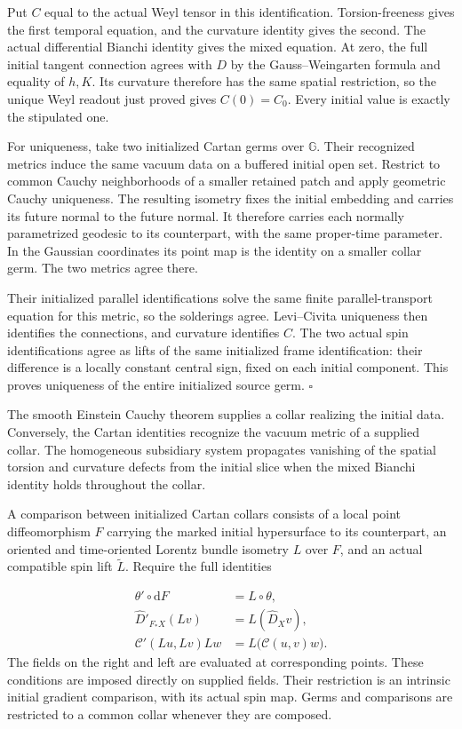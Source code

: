 \documentclass[
  english,
  11pt,
  reqno]{amsart}
\begin{document}
Put \(C\) equal to the actual Weyl tensor in this identification.
Torsion-freeness gives the first temporal equation, and the curvature
identity gives the second. The actual differential Bianchi identity
gives the mixed equation. At zero, the full initial tangent connection
agrees with \(D\) by the Gauss--Weingarten formula and equality of
\(h,K\). Its curvature therefore has the same spatial restriction, so
the unique Weyl readout just proved gives \(C(0)=C_0\). Every initial
value is exactly the stipulated one.

For uniqueness, take two initialized Cartan germs over \(\mathbb G\).
Their recognized metrics induce the same vacuum data on a buffered
initial open set. Restrict to common Cauchy neighborhoods of a smaller
retained patch and apply geometric Cauchy uniqueness. The resulting
isometry fixes the initial embedding and carries its future normal to
the future normal. It therefore carries each normally parametrized
geodesic to its counterpart, with the same proper-time parameter. In the
Gaussian coordinates its point map is the identity on a smaller collar
germ. The two metrics agree there.

Their initialized parallel identifications solve the same finite
parallel-transport equation for this metric, so the solderings agree.
Levi--Civita uniqueness then identifies the connections, and curvature
identifies \(C\). The two actual spin identifications agree as lifts of
the same initialized frame identification: their difference is a locally
constant central sign, fixed on each initial component. This proves
uniqueness of the entire initialized source germ. \hfill\(\square\)

The smooth Einstein Cauchy theorem supplies a collar realizing the
initial data. Conversely, the Cartan identities recognize the vacuum
metric of a supplied collar. The homogeneous subsidiary system
propagates vanishing of the spatial torsion and curvature defects from
the initial slice when the mixed Bianchi identity holds throughout the
collar.

A comparison between initialized Cartan collars consists of a local
point diffeomorphism \(F\) carrying the marked initial hypersurface to
its counterpart, an oriented and time-oriented Lorentz bundle isometry
\(L\) over \(F\), and an actual compatible spin lift \(\widetilde L\).
Require the full identities

\label{eq:online-cartan-physical-comparison} \[
\begin{aligned}
\theta'\circ\mathrm dF&=L\circ\theta,\\
\widehat D'_{F_*X}(Lv)&=L(\widehat D_Xv),\\
\mathcal C'(Lu,Lv)Lw&=L\bigl(\mathcal C(u,v)w\bigr).
\end{aligned}
\] The fields on the right and left are evaluated at corresponding
points. These conditions are imposed directly on supplied fields. Their
restriction is an intrinsic initial gradient comparison, with its actual
spin map. Germs and comparisons are restricted to a common collar
whenever they are composed.
\end{document}
